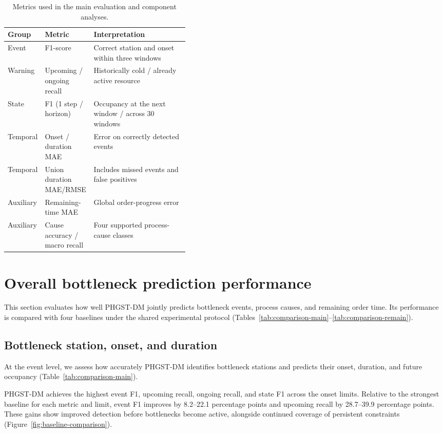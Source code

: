 \begin{table}[!htbp]
\centering
\caption{Metrics used in the main evaluation and component analyses.}
\label{tab:exp-metrics}
\footnotesize
\setlength{\tabcolsep}{3.5pt}
\renewcommand{\arraystretch}{1.08}
\begin{tabularx}{\linewidth}{@{}p{0.14\linewidth}p{0.27\linewidth}Y@{}}
\toprule
Group & Metric & Interpretation \\
\midrule
Event & F1-score & Correct station and onset within three windows \\
Warning & Upcoming / ongoing recall & Historically cold / already active resource \\
State & F1 (1 step / horizon) & Occupancy at the next window / across 30 windows \\
Temporal & Onset / duration MAE & Error on correctly detected events \\
Temporal & Union duration MAE/RMSE & Includes missed events and false positives \\
Auxiliary & Remaining-time MAE & Global order-progress error \\
Auxiliary & Cause accuracy / macro recall & Four supported process-cause classes \\
\bottomrule
\end{tabularx}
\end{table}

\FloatBarrier
\section{Overall bottleneck prediction performance}\label{sec:comparison-overview}

This section evaluates how well PHGST-DM jointly predicts bottleneck events, process causes, and remaining order time. Its performance is compared with four baselines under the shared experimental protocol (Tables~\ref{tab:comparison-main}--\ref{tab:comparison-remain}).

\subsection{Bottleneck station, onset, and duration}\label{sec:comparison-event}

At the event level, we assess how accurately PHGST-DM identifies bottleneck stations and predicts their onset, duration, and future occupancy (Table~\ref{tab:comparison-main}).

PHGST-DM achieves the highest event F1, upcoming recall, ongoing recall, and state F1 across the onset limits. Relative to the strongest baseline for each metric and limit, event F1 improves by 8.2--22.1 percentage points and upcoming recall by 28.7--39.9 percentage points. These gains show improved detection before bottlenecks become active, alongside continued coverage of persistent constraints (Figure~\ref{fig:baseline-comparison}).


